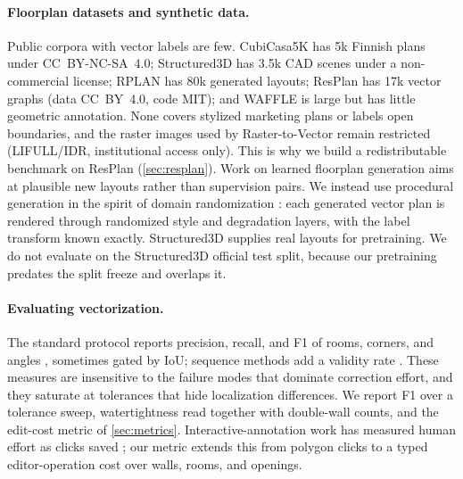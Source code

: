 \documentclass{article}
\begin{document}
\paragraph{Floorplan datasets and synthetic data.}
Public corpora with vector labels are few. CubiCasa5K
\citep{kalervo2019cubicasa} has 5k Finnish plans under CC~BY-NC-SA~4.0;
Structured3D \citep{zheng2020structured3d} has 3.5k CAD scenes under a
non-commercial license; RPLAN \citep{wu2019rplan} has 80k generated layouts;
ResPlan \citep{resplan2025} has 17k vector graphs (data CC~BY~4.0, code MIT);
and WAFFLE \citep{ganon2025waffle} is large but has little geometric
annotation. None covers stylized marketing plans or labels open boundaries, and
the raster images used by Raster-to-Vector remain restricted (LIFULL/IDR,
institutional access only). This is why we build a redistributable benchmark on
ResPlan (\cref{sec:resplan}). Work on learned floorplan generation
\citep{li2019grains,hu2020graph2plan,sun2022wallplan,shabani2023housediffusion,paschalidou2021atiss}
aims at plausible new layouts rather than supervision pairs. We instead use
procedural generation in the spirit of domain randomization
\citep{tobin2017domainrandomization}: each generated vector plan is rendered
through randomized style and degradation layers, with the label transform known
exactly. Structured3D supplies real layouts for pretraining. We do
not evaluate on the Structured3D official test split, because our pretraining
predates the split freeze and overlaps it.

\paragraph{Evaluating vectorization.}
The standard protocol reports precision, recall, and F1 of rooms, corners, and
angles \citep{liu2017raster,chen2022heat,yue2023roomformer,phung2026raster2seq},
sometimes gated by IoU; sequence methods add a validity rate
\citep{floorplanvlm2026}. These measures are insensitive to the failure modes
that dominate correction effort, and they saturate at tolerances that hide
localization differences. We report F1 over a tolerance sweep, watertightness
read together with double-wall counts, and the edit-cost metric of
\cref{sec:metrics}. Interactive-annotation work has measured human effort as
clicks saved \citep{acuna2018polygonrnnpp}; our metric extends this from
polygon clicks to a typed editor-operation cost over walls, rooms, and
openings.

\end{document}
